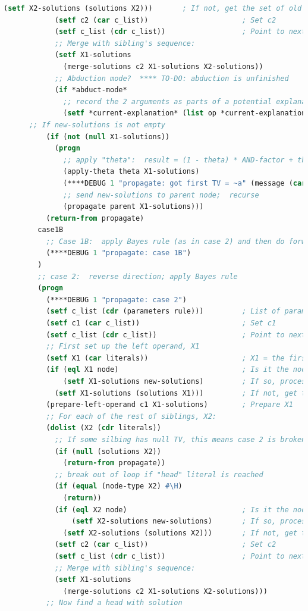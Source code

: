 \begin{lstlisting}[language=Lisp]
              (setf X2-solutions (solutions X2)))       ; If not, get the set of old solutions
            (setf c2 (car c_list))                      ; Set c2
            (setf c_list (cdr c_list))                  ; Point to next element
            ;; Merge with sibling's sequence:
            (setf X1-solutions
              (merge-solutions c2 X1-solutions X2-solutions))
            ;; Abduction mode?  **** TO-DO: abduction is unfinished
            (if *abduct-mode*
              ;; record the 2 arguments as parts of a potential explanation
              (setf *current-explanation* (list op *current-explanation* arg))))
      ;; If new-solutions is not empty
          (if (not (null X1-solutions))
            (progn
              ;; apply "theta":  result = (1 - theta) * AND-factor + theta * OR-factor
              (apply-theta theta X1-solutions)
              (****DEBUG 1 "propagate: got first TV = ~a" (message (car X1-solutions)))
              ;; send new-solutions to parent node;  recurse
              (propagate parent X1-solutions)))
          (return-from propagate)
        case1B
          ;; Case 1B:  apply Bayes rule (as in case 2) and then do forward (as in case 1A)
          (****DEBUG 1 "propagate: case 1B")
        )
        ;; case 2:  reverse direction; apply Bayes rule
        (progn
          (****DEBUG 1 "propagate: case 2")
          (setf c_list (cdr (parameters rule)))         ; List of parameters c1,c2,...
          (setf c1 (car c_list))                        ; Set c1
          (setf c_list (cdr c_list))                    ; Point to next element
          ;; First set up the left operand, X1
          (setf X1 (car literals))                      ; X1 = the first literal
          (if (eql X1 node)                             ; Is it the node with new solutions?
              (setf X1-solutions new-solutions)         ; If so, process new-solutions *only*
            (setf X1-solutions (solutions X1)))         ; If not, get the set of old solutions
          (prepare-left-operand c1 X1-solutions)        ; Prepare X1
          ;; For each of the rest of siblings, X2:
          (dolist (X2 (cdr literals))
            ;; If some silbing has null TV, this means case 2 is broken
            (if (null (solutions X2))
              (return-from propagate))
            ;; break out of loop if "head" literal is reached
            (if (equal (node-type X2) #\H)
              (return))
            (if (eql X2 node)                           ; Is it the node with new solutions?
                (setf X2-solutions new-solutions)       ; If so, process new-solutions *only*
              (setf X2-solutions (solutions X2)))       ; If not, get the set of old solutions
            (setf c2 (car c_list))                      ; Set c2
            (setf c_list (cdr c_list))                  ; Point to next element
            ;; Merge with sibling's sequence:
            (setf X1-solutions
              (merge-solutions c2 X1-solutions X2-solutions)))
          ;; Now find a head with solution
              

\end{lstlisting}

